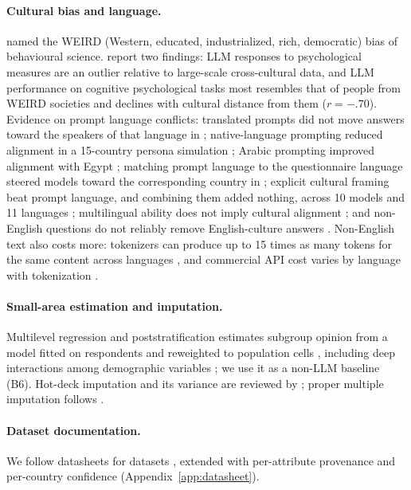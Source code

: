 \documentclass[10pt]{article}
\begin{document}
\paragraph{Cultural bias and language.} \citet{henrich2010} named the WEIRD (Western, educated, industrialized, rich, democratic) bias of behavioural science. \citet{atari2023} report two findings: LLM responses to psychological measures are an outlier relative to large-scale cross-cultural data, and LLM performance on cognitive psychological tasks most resembles that of people from WEIRD societies and declines with cultural distance from them ($r=-.70$). Evidence on prompt language conflicts: translated prompts did not move answers toward the speakers of that language in \citet{durmus2023}; native-language prompting reduced alignment in a 15-country persona simulation \citep{kwok2024}; Arabic prompting improved alignment with Egypt \citep{alkhamissi2024}; matching prompt language to the questionnaire language steered models toward the corresponding country in \citet{liu2025}; explicit cultural framing beat prompt language, and combining them added nothing, across 10 models and 11 languages \citep{bulte2026}; multilingual ability does not imply cultural alignment \citep{rystrom2025}; and non-English questions do not reliably remove English-culture answers \citep{wang2023thanksgiving}. Non-English text also costs more: tokenizers can produce up to 15 times as many tokens for the same content across languages \citep{petrov2023}, and commercial API cost varies by language with tokenization \citep{ahia2023}.

\paragraph{Small-area estimation and imputation.} Multilevel regression and poststratification estimates subgroup opinion from a model fitted on respondents and reweighted to population cells \citep{park2004mrp}, including deep interactions among demographic variables \citep{ghitza2013}; we use it as a non-LLM baseline (B6). Hot-deck imputation and its variance are reviewed by \citet{andridge2010}; proper multiple imputation follows \citet{rubin1987}.

\paragraph{Dataset documentation.} We follow datasheets for datasets \citep{gebru2021}, extended with per-attribute provenance and per-country confidence (Appendix~\ref{app:datasheet}).
\end{document}

